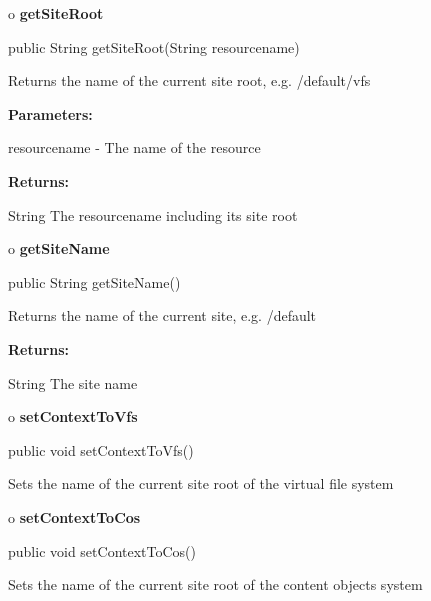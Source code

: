 o {\bf getSiteRoot} 

\begin{PRE}
 public String getSiteRoot(String resourcename)
\end{PRE}

\begin{description}
\htmlDD Returns the name of the current site root, e.g. /default/vfs 

\begin{description}
\item {\bf Parameters:}  

resourcename - The name of the resource  
\item {\bf Returns:}  

String The resourcename including its site root  
\end{description}

\end{description}

o {\bf getSiteName} 

\begin{PRE}
 public String getSiteName()
\end{PRE}

\begin{description}
\htmlDD Returns the name of the current site, e.g. /default 

\begin{description}
\item {\bf Returns:}  

String The site name  
\end{description}

\end{description}

o {\bf setContextToVfs} 

\begin{PRE}
 public void setContextToVfs()
\end{PRE}

\begin{description}
\htmlDD Sets the name of the current site root of the virtual file system 

\end{description}

o {\bf setContextToCos} 

\begin{PRE}
 public void setContextToCos()
\end{PRE}

\begin{description}
\htmlDD Sets the name of the current site root of the content objects system 

\end{description}

